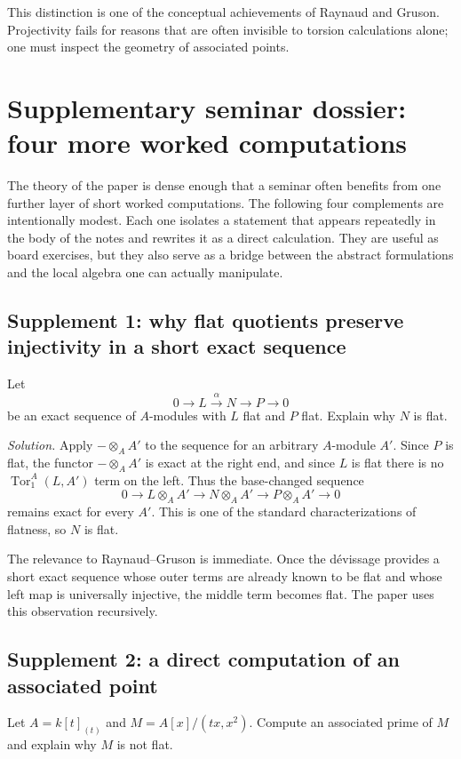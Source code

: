 \documentclass[11pt,oneside]{article}
\newcommand{\Tor}{\operatorname{Tor}}
\newcommand{\ot}{\otimes}
\begin{document}
This distinction is one of the conceptual achievements of Raynaud and Gruson.  Projectivity fails for reasons that are often invisible to torsion calculations alone; one must inspect the geometry of associated points.



\section{Supplementary seminar dossier: four more worked computations}

The theory of the paper is dense enough that a seminar often benefits from one further layer of short worked computations.  The following four complements are intentionally modest.  Each one isolates a statement that appears repeatedly in the body of the notes and rewrites it as a direct calculation.  They are useful as board exercises, but they also serve as a bridge between the abstract formulations and the local algebra one can actually manipulate.

\subsection*{Supplement 1: why flat quotients preserve injectivity in a short exact sequence}

Let
\[
0\to L\xrightarrow{\alpha} N\to P\to 0
\]
be an exact sequence of $A$-modules with $L$ flat and $P$ flat.  Explain why $N$ is flat.

\emph{Solution.}  Apply $-\ot_A A'$ to the sequence for an arbitrary $A$-module $A'$.  Since $P$ is flat, the functor $-\ot_A A'$ is exact at the right end, and since $L$ is flat there is no $\Tor_1^A(L,A')$ term on the left.  Thus the base-changed sequence
\[
0\to L\ot_A A'\to N\ot_A A'\to P\ot_A A'\to 0
\]
remains exact for every $A'$.  This is one of the standard characterizations of flatness, so $N$ is flat.

The relevance to Raynaud--Gruson is immediate.  Once the d\'evissage provides a short exact sequence whose outer terms are already known to be flat and whose left map is universally injective, the middle term becomes flat.  The paper uses this observation recursively.

\subsection*{Supplement 2: a direct computation of an associated point}

Let $A=k[t]_{(t)}$ and $M=A[x]/(tx,x^2)$.  Compute an associated prime of $M$ and explain why $M$ is not flat.
\end{document}
